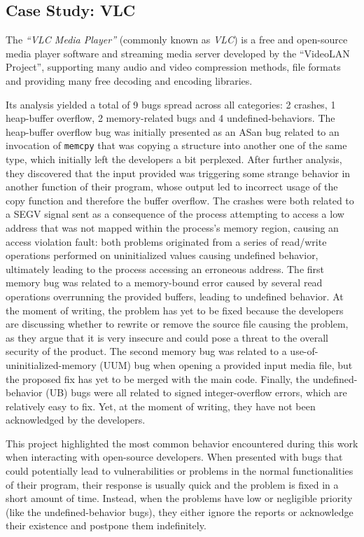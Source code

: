 \newpage
\subsection{Case Study: VLC}
The \textit{``VLC Media Player''} (commonly known as \textit{VLC}) \cite{vlc} is a free and open-source media player software and streaming media server developed by the ``VideoLAN Project'', supporting many audio and video compression methods, file formats and providing many free decoding and encoding libraries.

Its analysis yielded a total of 9 bugs spread across all categories: 2 crashes, 1 heap-buffer overflow, 2 memory-related bugs and 4 undefined-behaviors.
The heap-buffer overflow bug was initially presented as an ASan bug related to an invocation of \verb|memcpy| that was copying a structure into another one of the same type, which initially left the developers a bit perplexed. After further analysis, they discovered that the input provided was triggering some strange behavior in another function of their program, whose output led to incorrect usage of the copy function and therefore the buffer overflow.
The crashes were both related to a SEGV signal sent as a consequence of the process attempting to access a low address that was not mapped within the process's memory region, causing an access violation fault: both problems originated from a series of read/write operations performed on uninitialized values causing undefined behavior, ultimately leading to the process accessing an erroneous address.
The first memory bug was related to a memory-bound error caused by several read operations overrunning the provided buffers, leading to undefined behavior. At the moment of writing, the problem has yet to be fixed because the developers are discussing whether to rewrite or remove the source file causing the problem, as they argue that it is very insecure and could pose a threat to the overall security of the product.
The second memory bug was related to a use-of-uninitialized-memory (UUM) bug when opening a provided input media file, but the proposed fix has yet to be merged with the main code.
Finally, the undefined-behavior (UB) bugs were all related to signed integer-overflow errors, which are relatively easy to fix. Yet, at the moment of writing, they have not been acknowledged by the developers.

This project highlighted the most common behavior encountered during this work when interacting with open-source developers.
When presented with bugs that could potentially lead to vulnerabilities or problems in the normal functionalities of their program, their response is usually quick and the problem is fixed in a short amount of time. 
Instead, when the problems have low or negligible priority (like the undefined-behavior bugs), they either ignore the reports or acknowledge their existence and postpone them indefinitely.



